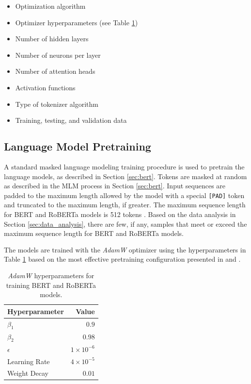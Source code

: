 \documentclass[12pt]{article}
\begin{document}
\begin{itemize}
    \item Optimization algorithm
    \item Optimizer hyperparameters (see Table \ref{tab:optim_params})
    \item Number of hidden layers
    \item Number of neurons per layer
    \item Number of attention heads
    \item Activation functions
    \item Type of tokenizer algorithm
    \item Training, testing, and validation data
\end{itemize}

\subsection{Language Model Pretraining}\label{sec:lm_pretraining}
A standard masked language modeling training procedure is used to pretrain the language models, as described in Section \ref{sec:bert}. Tokens are
masked at random as described in the MLM process in Section \ref{sec:bert}. Input sequences are padded to the maximum length allowed by the model with
a special \lstinline|[PAD]| token and truncated to the maximum length, if greater. The maximum sequence length for BERT and RoBERTa models is 512
tokens \cite{devlin_bert_2019,liu_roberta_2019}. Based on the data analysis in Section \ref{sec:data_analysis}, there are few, if any, samples that
meet or exceed the maximum sequence length for BERT and RoBERTa models.

The models are trained with the \textit{AdamW} optimizer \cite{loshchilov_decoupled_2019} using the hyperparameters in Table \ref{tab:optim_params}
based on the most effective pretraining configuration presented in \cite{devlin_bert_2019} and \cite{liu_roberta_2019}.

\begin{table}[!t]
    \centering
    \begin{tabular}{l r}
        \toprule
        Hyperparameter & Value              \\
        \midrule
        $\beta_1$      & $0.9$              \\
        $\beta_2$      & $0.98$             \\
        $\epsilon$     & $1 \times 10^{-6}$ \\
        Learning Rate  & $4 \times 10^{-5}$ \\
        Weight Decay   & $0.01$             \\
        \bottomrule
    \end{tabular}
    \caption{\textit{AdamW} hyperparameters for training BERT and RoBERTa models.}
    \label{tab:optim_params}
\end{table}
\end{document}
